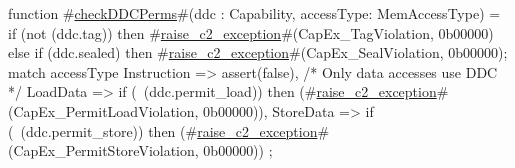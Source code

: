 function #\hyperref[zcheckDDCPerms]{checkDDCPerms}#(ddc : Capability, accessType: MemAccessType) = 
  {
    if (not (ddc.tag)) then
      #\hyperref[zraisezyc2zyexception]{raise\_c2\_exception}#(CapEx_TagViolation, 0b00000)
    else if (ddc.sealed) then
      #\hyperref[zraisezyc2zyexception]{raise\_c2\_exception}#(CapEx_SealViolation, 0b00000);
    match accessType {
      Instruction  => assert(false), /* Only data accesses use DDC */
      LoadData     => if (~(ddc.permit_load)) then (#\hyperref[zraisezyc2zyexception]{raise\_c2\_exception}#(CapEx_PermitLoadViolation, 0b00000)),
      StoreData    => if (~(ddc.permit_store)) then (#\hyperref[zraisezyc2zyexception]{raise\_c2\_exception}#(CapEx_PermitStoreViolation, 0b00000))
    };
  }
